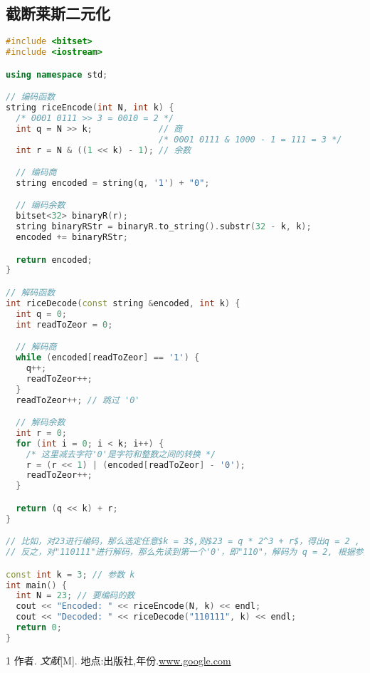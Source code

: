 \documentclass{/home/hi/Study/template/code}
\begin{document}
\subsection{截断莱斯二元化}
\begin{lstlisting}[language=c++]
#include <bitset>
#include <iostream>

using namespace std;

// 编码函数
string riceEncode(int N, int k) {
  /* 0001 0111 >> 3 = 0010 = 2 */
  int q = N >> k;             // 商
                              /* 0001 0111 & 1000 - 1 = 111 = 3 */
  int r = N & ((1 << k) - 1); // 余数

  // 编码商
  string encoded = string(q, '1') + "0";

  // 编码余数
  bitset<32> binaryR(r);
  string binaryRStr = binaryR.to_string().substr(32 - k, k);
  encoded += binaryRStr;

  return encoded;
}

// 解码函数
int riceDecode(const string &encoded, int k) {
  int q = 0;
  int readToZeor = 0;

  // 解码商
  while (encoded[readToZeor] == '1') {
    q++;
    readToZeor++;
  }
  readToZeor++; // 跳过 '0'

  // 解码余数
  int r = 0;
  for (int i = 0; i < k; i++) {
    /* 这里减去字符'0'是字符和整数之间的转换 */
    r = (r << 1) | (encoded[readToZeor] - '0');
    readToZeor++;
  }

  return (q << k) + r;
}

// 比如，对23进行编码，那么选定任意$k = 3$,则$23 = q * 2^3 + r$，得出q = 2 , r = 7，则q = "110" , r = "111"，则编码结果为"110111"
// 反之，对"110111"进行解码，那么先读到第一个'0'，即"110"，解码为 q = 2, 根据参数k=3可知，再继续读取3位则为余数r = b'111' = 7, 故$2 * 2^3 + 7 = 23$

const int k = 3; // 参数 k
int main() {
  int N = 23; // 要编码的数
  cout << "Encoded: " << riceEncode(N, k) << endl;
  cout << "Decoded: " << riceDecode("110111", k) << endl;
  return 0;
}
\end{lstlisting}

\newpage
\begin{thebibliography}{1}
	 作者. \emph{文献}[M]. 地点:出版社,年份.\url{www.google.com}
\end{thebibliography}
\end{document}
